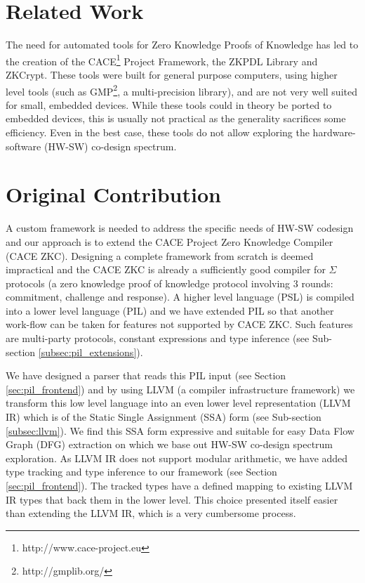 \section{Related Work}

The need for automated tools for Zero Knowledge Proofs of Knowledge
has led to the creation of the
CACE\footnote{http://www.cace-project.eu} Project Framework, the ZKPDL
Library and ZKCrypt. These tools were built for general purpose
computers, using higher level tools (such as
GMP\footnote{http://gmplib.org/}, a multi-precision library), and are
not very well suited for small, embedded devices. While these tools
could in theory be ported to embedded devices, this is usually not
practical as the generality sacrifices some efficiency. Even in the
best case, these tools do not allow exploring the hardware-software
(HW-SW) co-design spectrum.

\section{Original Contribution}

A custom framework is needed to address the specific needs of HW-SW
codesign and our approach is to extend the CACE Project Zero Knowledge
Compiler (CACE ZKC). Designing a complete framework from scratch is
deemed impractical and the CACE ZKC is already a sufficiently good
compiler for $\Sigma$ protocols (a zero knowledge proof of knowledge
protocol involving 3 rounds: commitment, challenge and response). A
higher level language (PSL) is compiled into a lower level language
(PIL) and we have extended PIL so that another work-flow can be taken
for features not supported by CACE ZKC. Such features are multi-party
protocols, constant expressions and type inference (see Sub-section
\ref{subsec:pil_extensions}).

We have designed a parser that reads this PIL input (see Section
\ref{sec:pil_frontend}) and by using LLVM (a compiler infrastructure
framework) we transform this low level language into an even lower
level representation (LLVM IR) which is of the Static Single
Assignment (SSA) form (see Sub-section \ref{subsec:llvm}). We find
this SSA form expressive and suitable for easy Data Flow Graph (DFG)
extraction on which we base out HW-SW co-design spectrum
exploration. As LLVM IR does not support modular arithmetic, we have
added type tracking and type inference to our framework (see Section
\ref{sec:pil_frontend}). The tracked types have a defined mapping to
existing LLVM IR types that back them in the lower level. This choice
presented itself easier than extending the LLVM IR, which is a very
cumbersome process.

